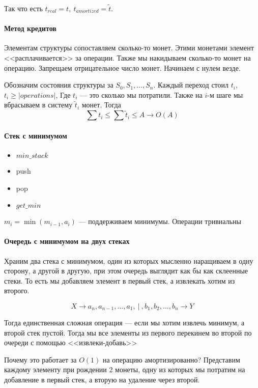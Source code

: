 \documentclass[12pt]{article}
\begin{document}
Так что есть $t_{real} = t,\ t_{amortized} = \tilde t$.

\paragraph{Метод кредитов}

Элементам структуры сопоставляем сколько-то монет. Этими монетами элемент <<расплачивается>> за операции. Также мы накидываем сколько-то монет на операцию. Запрещаем отрицательное число монет. Начинаем с нулем везде.

Обозначим состояния структуры за $S_0, S_1, \dots, S_n$. Каждый переход стоил $t_i$, $t_i \ge |operations|$, Где $t_i$ --- это сколько мы потратили. Также на $i$-м шаге мы вбрасываем в систему $\tilde t_i$ монет. Тогда $$\sum t_i \le \sum \tilde t_i \le A \rightarrow O(A)$$

\paragraph{Стек с минимумом}

\begin{itemize}
    \item $min\_stack$
    \item push
    \item pop
    \item $get\_min$
\end{itemize}

$m_i = \min (m_{i-1}, a_i)$ --- поддерживаем минимумы. Операции тривиальны

\paragraph{Очередь с минимумом на двух стеках}

Храним два стека с минимумом, один из которых мысленно наращиваем в одну сторону, а другой в другую, при этом очередь выглядит как бы как склеенные стеки. То есть мы добавляем элемент в первый стек, а извлекать хотим из второго.

$$X \rightarrow a_n, a_{n - 1}, \dots, a_1,\ |\ , b_1, b_2, \dots, b_n \rightarrow Y$$

Тогда единственная сложная операция --- если мы хотим извлечь минимум, а второй стек пустой. Тогда мы все элементы из первого перекинем во второй по очереди с помощью <<извлеки-добавь>>

Почему это работает за $O(1)$ на операцию амортизированно? Представим каждому элементу при рождении 2 монеты, одну из которых мы потратим на добавление в первый стек, а вторую на удаление через второй.
\end{document}
